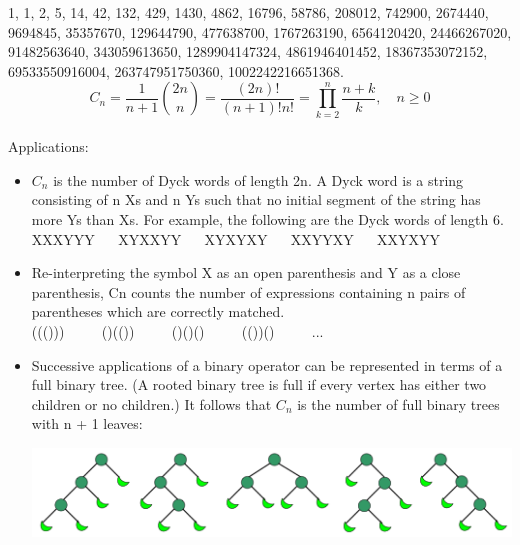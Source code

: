 \documentclass[10pt, twocolumn]{article}
\begin{document}
\begin{flushleft}
1, 1, 2, 5, 14, 42, 132, 429, 1430, 4862, 16796, 58786, 208012, 742900, 2674440, 9694845, 35357670, 129644790, 477638700, 1767263190, 6564120420, 24466267020, 91482563640, 343059613650, 1289904147324, 4861946401452, 18367353072152, 69533550916004, 263747951750360, 1002242216651368.\\

$$C_n = \frac{1}{n+1}\binom{2n}{n} = \frac{(2n)!}{(n+1)!n!} = \prod_{k=2}^{n} \frac{n+k}{k}, \quad n \geq 0$$\\


Applications:
\begin{itemize}
\item $C_n$ is the number of Dyck words of length 2n. A Dyck word is a string consisting of n Xs and n Ys such that no initial segment of the string has more Ys than Xs. For example, the following are the Dyck words of length 6.\\
XXXYYY  $\quad$  XYXXYY  $\quad$  XYXYXY  $\quad$  XXYYXY  $\quad$  XXYXYY


\item Re-interpreting the symbol X as an open parenthesis and Y as a close parenthesis, Cn counts the number of expressions containing n pairs of parentheses which are correctly matched.\\
((()))  $\qquad$  ()(())  $\qquad$  ()()()  $\qquad$  (())()  $\qquad$  ...


\item Successive applications of a binary operator can be represented in terms of a full binary tree. (A rooted binary tree is full if every vertex has either two children or no children.) It follows that $C_n$ is the number of full binary trees with n + 1 leaves:\\
\begin{center}
\includegraphics[scale=0.45]{Catalan_number_binary_tree_example.png}
\end{center}



\end{itemize}
\end{flushleft}
\end{document}
